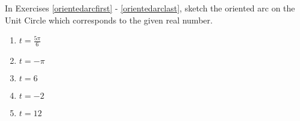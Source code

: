 \documentclass[10pt]{article}
\begin{document}

In Exercises \ref{orientedarcfirst} - \ref{orientedarclast}, sketch the oriented arc on the Unit Circle which  corresponds to the given real number. 

\begin{multicols}{5} 

\begin{enumerate}

\setcounter{enumi}{\value{HW}}

\item $t=\frac{5 \pi}{6}$ \label{orientedarcfirst}

\item $t=-\pi$

\item $t = 6$

\item  $t = -2$

\item  $t = 12$ \label{orientedarclast}

\setcounter{HW}{\value{enumi}}

\end{enumerate}

\end{multicols}






\end{document}
